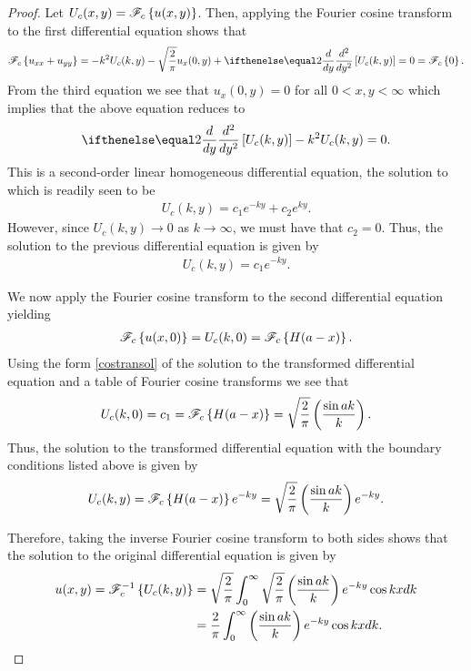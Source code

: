 \begin{proof}
  Let $U_c(x, y) = \mathscr{F}_c\left\{ {u(x,y)} \right\}$. Then, applying the Fourier cosine transform to the first differential equation shows
  that
  \begin{align*}
    \fouriercos{u_{xx} + u_{yy}} = -k^2 U_c(k,y) - \sqrt{\frac{2}{\pi}}u_x(0,y) + \der{y}{2}\left[U_c(k,y)\right] = 0 = \fouriercos{0}.
  \end{align*}
  From the third equation we see that $u_x(0, y) = 0$ for all $0 < x,y < \infty$
  which implies that the above equation reduces to
  \begin{align*}
    \der{y}{2}\left[U_c(k,y)\right] -k^2 U_c(k,y) = 0.
  \end{align*}
  This is a second-order linear homogeneous differential equation, the solution to which is readily seen
  to be
  \begin{align*}
    U_c(k,y) = c_1 e^{-ky} + c_2 e^{k y}.
  \end{align*}
  However, since $U_c(k,y) \to 0$ as $k \to \infty$, we must have that
  $c_2 = 0$. Thus, the solution to the previous differential equation is given by
  \begin{align}\label{costransol}
    U_c(k,y) = c_1 e^{-ky}.
  \end{align}

  We now apply the Fourier cosine transform to the second differential equation yielding
  \begin{align*}
    \mathscr{F}_c\left\{ {u(x, 0)} \right\} = U_c(k, 0) = \mathscr{F}_c\left\{ {H(a-x)} \right\}.
  \end{align*}
  Using the form \eqref{costransol} of the solution to the transformed differential equation
  and a table of Fourier cosine transforms we see that
  \begin{align*}
    U_c(k,0) = c_1 = \mathscr{F}_c\left\{ {H(a-x)} \right\} = \sqrt{\frac{2}{\pi}}\left(\frac{\sin ak}{k}\right).
  \end{align*}
  Thus, the solution to the transformed differential equation with the boundary conditions listed above is given by
  \begin{align*}
    U_c(k, y) = \mathscr{F}_c\left\{ {H(a-x)} \right\}e^{-ky} = \sqrt{\frac{2}{\pi}}\left(\frac{\sin ak}{k}\right)e^{-ky}.
  \end{align*}

  Therefore, taking the inverse Fourier cosine transform to both sides shows that
  the solution to the original differential equation is given by
  \begin{align*}
    u(x, y) = \mathscr{F}_c^{-1}\left\{ {U_c(k, y)} \right\}
    &= \sqrt{\frac{2}{\pi}} \int_0^\infty \sqrt{\frac{2}{\pi}}\left(\frac{\sin ak}{k}\right)e^{-ky} \cos kx dk \\
    &= \frac{2}{\pi} \int_0^\infty \left(\frac{\sin ak}{k}\right)e^{-ky} \cos kx dk.
  \end{align*}

\end{proof}
\newpage
